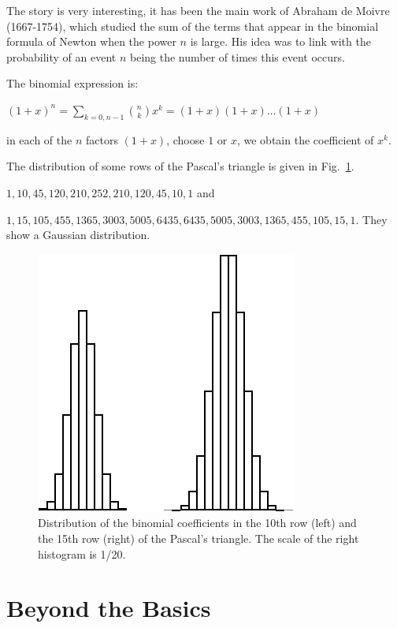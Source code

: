 The story is very interesting, it has been the main work of Abraham de Moivre (1667-1754), 
which studied the sum of the terms that appear in the binomial formula of Newton when the power $n$ is large.
His idea was to link with the probability of an event $n$ being the number of times this event occurs.

The binomial expression is:

$(1+x)^n = \sum_{k=0,n-1} {n \choose k} x^k = (1+x)(1+x)\ldots(1+x)$

in each of the $n$ factors $(1+x)$, choose $1$ or $x$, we obtain the coefficient of $x^k$.

\medskip

The distribution of some rows of the Pascal's triangle is given in Fig.~\ref{fig:gaussiandistribution}.

$1,10,45,120,210,252,210,120,45,10,1$ and

$1,15,105,455,1365,3003,5005,6435,6435,5005,3003,1365,455,105,15,1$.
They show a Gaussian distribution.
\begin{figure}[h]
\begin{center}
        \includegraphics[scale=0.5]{FiguresMaths/ProbaGaussianDistribution}
        \caption{Distribution of the binomial coefficients in the 10th row (left) and the 15th row (right) of the Pascal's triangle.
        The scale of the right histogram is 1/20.}
        \label{fig:gaussiandistribution}
\end{center}
\end{figure}


\section{Beyond the Basics}

